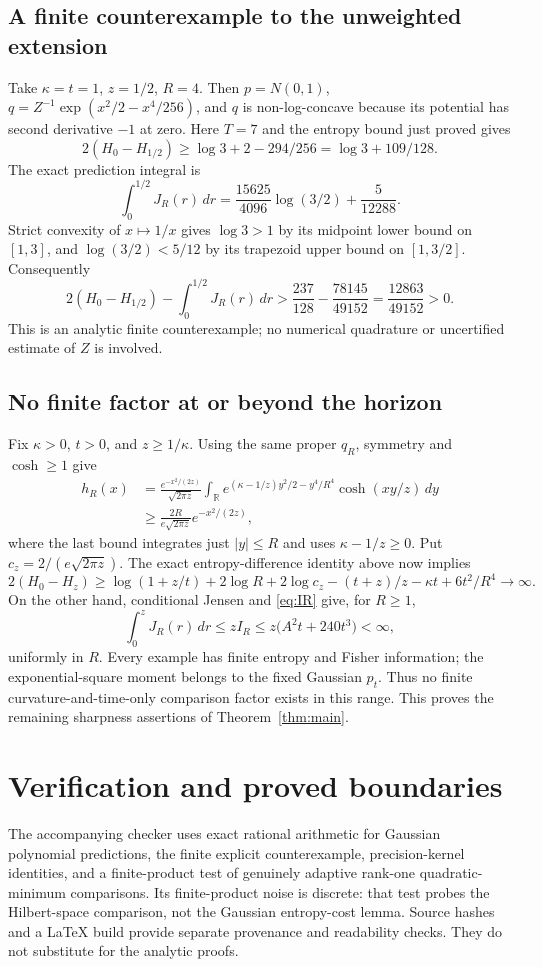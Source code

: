 \documentclass[11pt]{article}
\theoremstyle{remark}\newtheorem{remark}[theorem]{Remark}
\newcommand{\R}{\mathbb R}
\begin{document}
\subsection{A finite counterexample to the unweighted extension}
Take $\kappa=t=1$, $z=1/2$, $R=4$.
Then $p=N(0,1)$, $q=Z^{-1}\exp(x^2/2-x^4/256)$, and $q$ is non-log-concave
because its potential has second derivative $-1$ at zero.
Here $T=7$ and the entropy bound just proved gives
\[
2(H_0-H_{1/2})\ge\log3+2-294/256
=\log3+109/128.
\]
The exact prediction integral is
\[
\int_0^{1/2}J_R(r)\,dr
=\frac{15625}{4096}\log(3/2)+\frac5{12288}.
\]
Strict convexity of $x\mapsto1/x$ gives
$\log3>1$ by its midpoint lower bound on $[1,3]$,
and $\log(3/2)<5/12$ by its trapezoid upper bound on $[1,3/2]$.
Consequently
\[
2(H_0-H_{1/2})-\int_0^{1/2}J_R(r)\,dr
>\frac{237}{128}-\frac{78145}{49152}
=\frac{12863}{49152}>0.
\]
This is an analytic finite counterexample; no numerical quadrature or
uncertified estimate of $Z$ is involved.

\subsection{No finite factor at or beyond the horizon}
Fix $\kappa>0$, $t>0$, and $z\ge1/\kappa$.
Using the same proper $q_R$, symmetry and $\cosh\ge1$ give
\begin{align*}
h_R(x)
&=\frac{e^{-x^2/(2z)}}{\sqrt{2\pi z}}
\int_\R e^{(\kappa-1/z)y^2/2-y^4/R^4}\cosh(xy/z)\,dy\\
&\ge\frac{2R}{e\sqrt{2\pi z}}e^{-x^2/(2z)},
\end{align*}
where the last bound integrates just $|y|\le R$ and uses $\kappa-1/z\ge0$.
Put $c_z=2/(e\sqrt{2\pi z})$. The exact entropy-difference identity above
now implies
\[
2(H_0-H_z)\ge
\log(1+z/t)+2\log R+2\log c_z-(t+z)/z-\kappa t+6t^2/R^4
\longrightarrow\infty.
\]
On the other hand, conditional Jensen and \eqref{eq:IR} give, for $R\ge1$,
\[
\int_0^zJ_R(r)\,dr\le zI_R
\le z\bigl(A^2t+240t^3\bigr)<\infty,
\]
uniformly in $R$. Every example has finite entropy and Fisher information;
the exponential-square moment belongs to the fixed Gaussian $p_t$.
Thus no finite curvature-and-time-only comparison factor exists in this range.
This proves the remaining sharpness assertions of Theorem~\ref{thm:main}.

\section{Verification and proved boundaries}
The accompanying checker uses exact rational arithmetic for Gaussian
polynomial predictions, the finite explicit counterexample, precision-kernel
identities, and a finite-product test of genuinely adaptive rank-one
quadratic-minimum comparisons. Its finite-product noise is discrete: that
test probes the Hilbert-space comparison, not the Gaussian entropy-cost
lemma. Source hashes and a LaTeX build provide separate provenance and
readability checks. They do not substitute for the analytic proofs.
\end{document}
